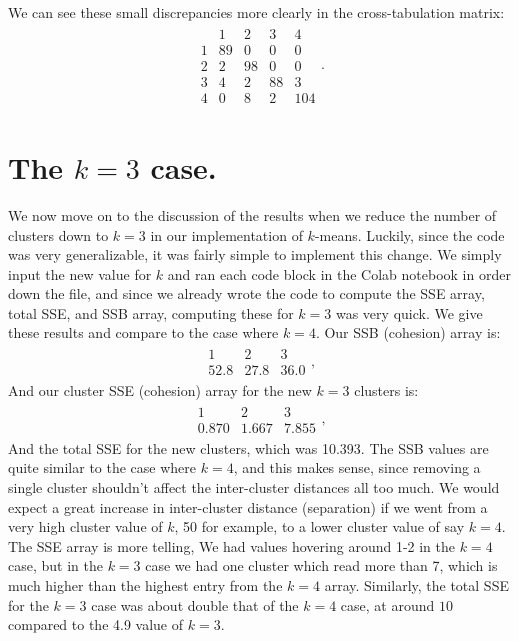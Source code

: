 \documentclass[12pt,oneside,reqno]{amsart}
\theoremstyle{plain}
\theoremstyle{definition}
\theoremstyle{remark}
\newcommand{\bb}{\vspace{3mm}}
\newcommand{\bee}{\begin{equation}\begin{aligned}}
\newcommand{\eee}{\end{aligned}\end{equation}}
\begin{document}
\bb

We can see these small discrepancies more clearly in the cross-tabulation matrix:
\bee
\begin{array}{l|llll}
&1&2&3&4\\
\hline
1&89 & 0 & 0 &0\\
2 & 2 & 98 & 0 & 0\\
3 & 4 & 2 & 88 & 3\\
4 & 0 & 8 & 2 & 104
\end{array}.
\eee

\section{The $k = 3$ case.}

We now move on to the discussion of the results when we reduce the number of clusters down to $k = 3$ in our implementation of $k$-means. Luckily, since the code was very generalizable, it was fairly simple to implement this change. We simply input the new value for $k$ and ran each code block in the Colab notebook in order down the file, and since we already wrote the code to compute the SSE array, total SSE, and SSB array, computing these for $k= 3$ was very quick. We give these results and compare to the case where $k = 4$. Our SSB (cohesion) array is:
\bee
\begin{array}{lll}
1 & 2 & 3\\
\hline
52.8 & 27.8 & 36.0
\end{array},
\eee
And our cluster SSE (cohesion) array for the new $k = 3$ clusters is:
\bee
\begin{array}{lll}
1 & 2 & 3\\
\hline
0.870 & 1.667 & 7.855
\end{array},
\eee
And the total SSE for the new clusters, which was 10.393. The SSB values are quite similar to the case where $k = 4$, and this makes sense, since removing a single cluster shouldn't affect the inter-cluster distances all too much. We would expect a great increase in inter-cluster distance (separation) if we went from a very high cluster value of $k$, 50 for example, to a lower cluster value of say $k = 4$. The SSE array is more telling, We had values hovering around 1-2 in the $k  = 4$ case, but in the $k = 3$ case we had one cluster which read more than 7, which is much higher than the highest entry from the $k = 4$ array. Similarly, the total SSE for the $k = 3$ case was about double that of the $k = 4$ case, at around $10$ compared to the 4.9 value of $k = 3$. 
\end{document}
